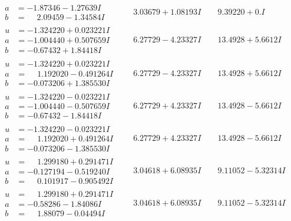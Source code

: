 \documentclass[1p]{elsarticle_modified}
\theoremstyle{definition}
\begin{document}
$$\begin{array}{c|c|c}
\begin{aligned}
a &= -1.87346 - 1.27639 I \\
b &= \phantom{-}2.09459 - 1.34584 I\end{aligned}
 & \phantom{-}3.03679 + 1.08193 I & \phantom{-}9.39220 + 0. I\phantom{ +0.000000I} \\ \hline\begin{aligned}
u &= -1.324220 + 0.023221 I \\
a &= -1.004440 + 0.507659 I \\
b &= -0.67432 + 1.84418 I\end{aligned}
 & \phantom{-}6.27729 - 4.23327 I & \phantom{-}13.4928 + 5.6612 I \\ \hline\begin{aligned}
u &= -1.324220 + 0.023221 I \\
a &= \phantom{-}1.192020 - 0.491264 I \\
b &= -0.073206 + 1.385530 I\end{aligned}
 & \phantom{-}6.27729 - 4.23327 I & \phantom{-}13.4928 + 5.6612 I \\ \hline\begin{aligned}
u &= -1.324220 - 0.023221 I \\
a &= -1.004440 - 0.507659 I \\
b &= -0.67432 - 1.84418 I\end{aligned}
 & \phantom{-}6.27729 + 4.23327 I & \phantom{-}13.4928 - 5.6612 I \\ \hline\begin{aligned}
u &= -1.324220 - 0.023221 I \\
a &= \phantom{-}1.192020 + 0.491264 I \\
b &= -0.073206 - 1.385530 I\end{aligned}
 & \phantom{-}6.27729 + 4.23327 I & \phantom{-}13.4928 - 5.6612 I \\ \hline\begin{aligned}
u &= \phantom{-}1.299180 + 0.291471 I \\
a &= -0.127194 - 0.519240 I \\
b &= \phantom{-}0.101917 - 0.905492 I\end{aligned}
 & \phantom{-}3.04618 + 6.08935 I & \phantom{-}9.11052 - 5.32314 I \\ \hline\begin{aligned}
u &= \phantom{-}1.299180 + 0.291471 I \\
a &= -0.58286 - 1.84086 I \\
b &= \phantom{-}1.88079 - 0.04494 I\end{aligned}
 & \phantom{-}3.04618 + 6.08935 I & \phantom{-}9.11052 - 5.32314 I\\

\end{array}$$
\end{document}
